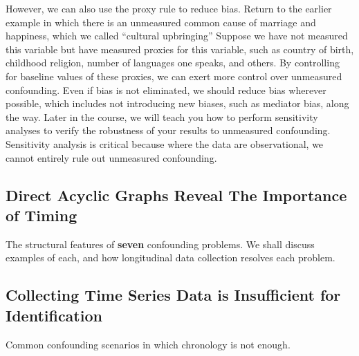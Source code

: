 \documentclass[
  single column]{article}
\begin{document}
However, we can also use the proxy rule to reduce bias. Return to the
earlier example in which there is an unmeasured common cause of marriage
and happiness, which we called ``cultural upbringing'' Suppose we have
not measured this variable but have measured proxies for this variable,
such as country of birth, childhood religion, number of languages one
speaks, and others. By controlling for baseline values of these proxies,
we can exert more control over unmeasured confounding. Even if bias is
not eliminated, we should reduce bias wherever possible, which includes
not introducing new biases, such as mediator bias, along the way. Later
in the course, we will teach you how to perform sensitivity analyses to
verify the robustness of your results to unmeasured confounding.
Sensitivity analysis is critical because where the data are
observational, we cannot entirely rule out unmeasured confounding.

\newpage{}

\subsection{Direct Acyclic Graphs Reveal The Importance of
Timing}\label{direct-acyclic-graphs-reveal-the-importance-of-timing}

\begin{table}

\caption{\label{tbl-elementary-chronological-hyg}}

\centering{

\captionsetup{labelsep=none}

\terminologychronologicalhygeine

}

\end{table}%

The structural features of \textbf{seven} confounding problems. We shall
discuss examples of each, and how longitudinal data collection resolves
each problem.

\newpage{}

\subsection{Collecting Time Series Data is Insufficient for
Identification}\label{collecting-time-series-data-is-insufficient-for-identification}

\begin{table}

\caption{\label{tbl-chronology-notenough}Common confounding scenarios in
which chronology is not enough.}

\centering{

\terminologychronologicalhygeineNOTENOUGH

}

\end{table}%
\end{document}
